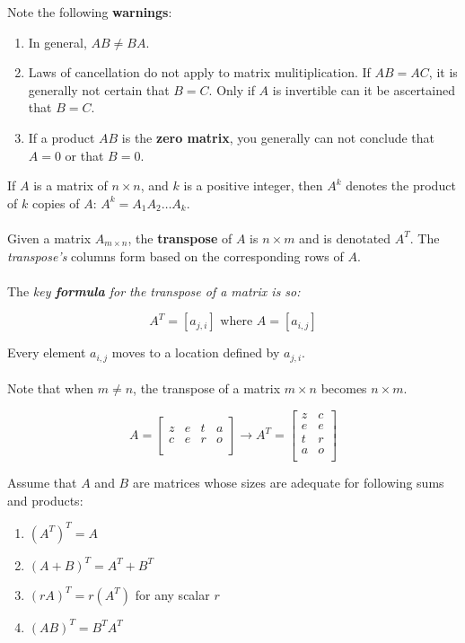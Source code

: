 \documentclass[12pt]{article}
\newcommand{\bt}[1]{\textbf{{#1}}}
\newcommand{\mb}{\begin{bmatrix}}
\newcommand{\me}{\end{bmatrix}}
\begin{document}
Note the following \bt{warnings}:

\begin{enumerate}
    \item In general, $AB \neq BA$.
    \item Laws of cancellation do not apply to matrix mulitiplication. If $AB = AC$, it is generally not certain that $B = C$. Only if $A$ is invertible can it be ascertained that $B = C$.
    \item If a product $AB$ is the \textbf{zero matrix}, you generally can not conclude that $A = 0$ or that $B = 0$.
\end{enumerate}

If $A$ is a matrix of $n \times n$, and $k$ is a positive integer, then $A^k$ denotes the product of $k$ copies of $A$: $A^k = A_1 A_2 \dots A_k$. \\ \\

Given a matrix $A_{m\times n}$, the \textbf{transpose} of $A$ is $n\times m$ and is denotated $A^T$. The \emph{transpose's} columns form
based on the corresponding rows of $A$. \\ \\

The \emph{key \bt{formula} for the transpose of a matrix is so:}

$$A^T = [a_{j,i}] \textrm{ where } A = [a_{i,j}]$$

Every element $a_{i,j}$ moves to a location defined by $a_{j,i}$. \\ \\

Note that when $m\neq n$, the transpose of a matrix $m\times n$ becomes $n\times m$.

$$A = \mb
z & e & t & a \\
c & e & r & o \\
\me \rightarrow
A^T = \mb
z & c \\
e & e \\
t & r \\
a & o \\
\me$$

Assume that $A$ and $B$ are matrices whose sizes are adequate for following sums and products:

\begin{enumerate}
    \item $(A^T)^T = A$
    \item $(A + B)^T = A^T + B^T$
    \item $(rA)^T = r(A^T)$ for any scalar $r$
    \item $(AB)^T = B^TA^T$
\end{enumerate}
\end{document}
